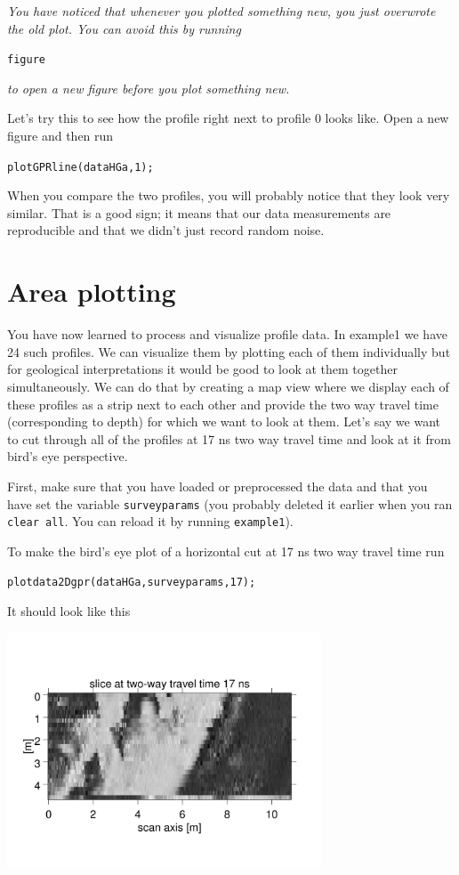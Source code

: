 \documentclass[11pt]{article}
\begin{document}
\emph{You have noticed that whenever you plotted something new, you
  just overwrote the old plot. You can avoid this by running}

\qquad \verb#figure#

\emph{to open a new figure before you plot something new.}

Let's try this to see how the profile right next to profile 0 looks
like. Open a new figure and then run

\qquad \verb#plotGPRline(dataHGa,1);#
   
When you compare the two profiles, you will probably notice that they look very
similar. That is a good sign; it means that our data measurements are
reproducible and that we didn't just record random noise.
 

\section{Area plotting}

You have now learned to process and visualize profile data. In
example1 we have 24 such profiles. We can visualize them by plotting
each of them individually but for geological interpretations it would
be good to look at them together simultaneously. We can do that by
creating a map view where we display each of these profiles as a strip
next to each other and provide the two way travel time (corresponding
to depth) for which we want to look at them. Let's say we want to cut
through all of the profiles at 17 ns two way travel time and look at
it from bird's eye perspective.

First, make sure that you have loaded or preprocessed the data and
that you have set the variable \verb#surveyparams# (you probably
deleted it earlier when you ran \verb#clear all#. You can reload it by
running \verb#example1#).

To make the bird's eye plot of a horizontal cut at 17 ns two way
travel time run

\qquad \verb#plotdata2Dgpr(dataHGa,surveyparams,17);#

It should look like this
\begin{center}
\includegraphics[width=0.7\textwidth, trim = 1cm 3cm 1cm
  3cm,clip]{figures/Area17ns.jpg}
\end{center}
\end{document}
